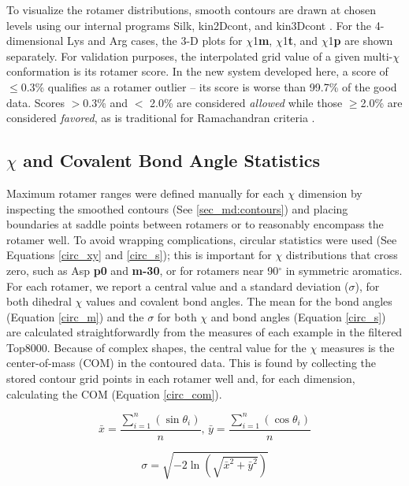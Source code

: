 To visualize the rotamer distributions, smooth contours are drawn at chosen levels using our internal programs Silk, kin2Dcont, and kin3Dcont \cite{Thesis:Word,Thesis:Davis}. For the 4-dimensional Lys and Arg cases, the 3-D plots for $\chi$1\textbf{m}, $\chi$1\textbf{t}, and $\chi$1\textbf{p} are shown separately. For validation purposes, the interpolated grid value of a given multi-$\chi$ conformation is its rotamer score. In the new system developed here, a score of $\le$0.3\% qualifies as a rotamer outlier -- its score is worse than 99.7\% of the good data. Scores $>$0.3\% and $<$ 2.0\% are considered \textit{allowed} while those $\ge$2.0\% are considered \textit{favored}, as is traditional for Ramachandran criteria \citep{Laskowski:gl0276,Lovell:2003uq}.

\subsection{$\chi$ and Covalent Bond Angle Statistics}
\label{sec_md:chi_stats}
Maximum rotamer ranges were defined manually for each $\chi$ dimension by inspecting the smoothed contours (See \ref{sec_md:contours}) and placing boundaries at saddle points between rotamers or to reasonably encompass the rotamer well. To avoid wrapping complications, circular statistics were used (See Equations \ref{circ_xy} and \ref{circ_s}); this is important for $\chi$ distributions that cross zero, such as Asp \textbf{p0} and \textbf{m-30}, or for rotamers near 90$^{\circ}$ in symmetric aromatics. For each rotamer, we report a central value and a standard deviation ($\sigma$), for both dihedral $\chi$ values and covalent bond angles. The mean for the bond angles (Equation \ref{circ_m}) and the $\sigma$ for both $\chi$ and bond angles (Equation \ref{circ_s}) are calculated straightforwardly from the measures of each example in the filtered Top8000. Because of complex shapes, the central value for the $\chi$ measures is the center-of-mass (COM) in the contoured data. This is found by collecting the stored contour grid points in each rotamer well and, for each dimension, calculating the COM (Equation \ref{circ_com}).

\begin{equation}
\bar{x} = \frac{\sum_{i=1}^{n}\left ( \sin \theta_{i} \right )}{n}
\textrm{, }
\bar{y} = \frac{\sum_{i=1}^{n}\left ( \cos \theta_{i} \right )}{n}
\label{circ_xy}
\end{equation}

\begin{equation}
\sigma = \sqrt{-2 \ln \left ( \sqrt{\bar{x}^{2} + \bar{y}^{2}} \right )}
\label{circ_s}
\end{equation}

